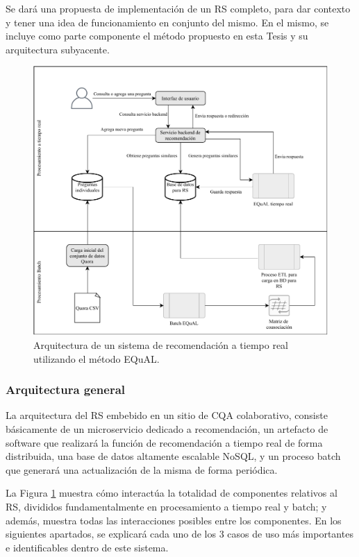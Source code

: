 \bigskip Se dará una propuesta de implementación de un RS completo, para dar contexto y tener una idea de funcionamiento en conjunto del mismo. En el mismo, se incluye como parte componente el método propuesto en esta Tesis y su arquitectura subyacente.

\bigskip
\begin{figure}[h!]
	\centering
	\includegraphics[width=0.9\linewidth]{8_problema_investigacion/imagenes/implementacion_rs}
	\caption{Arquitectura de un sistema de recomendación a tiempo real utilizando el método EQuAL.}
	\label{fig:implementacionrs}
\end{figure}

\subsubsection{Arquitectura general}
La arquitectura del RS embebido en un sitio de CQA colaborativo, consiste básicamente de un microservicio dedicado a recomendación, un artefacto de software que realizará la función de recomendación a tiempo real de forma distribuida, una base de datos altamente escalable NoSQL, y un proceso batch que generará una actualización de la misma de forma periódica.

La Figura \ref{fig:implementacionrs} muestra cómo interactúa la totalidad de componentes relativos al RS, divididos fundamentalmente en procesamiento a tiempo real y batch; y además, muestra todas las interacciones posibles entre los componentes. En los siguientes apartados, se explicará cada uno de los 3 casos de uso más importantes e identificables dentro de este sistema.

